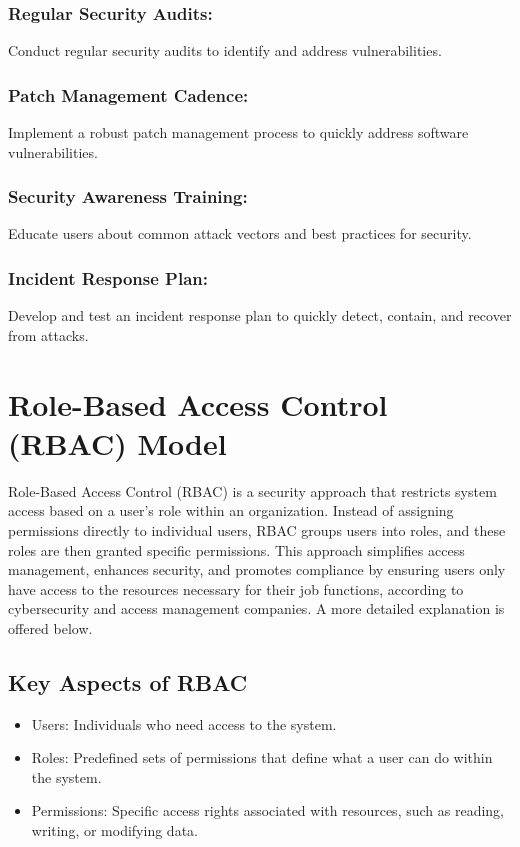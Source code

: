 \subsubsection{\textbf{Regular Security Audits:}}
Conduct regular security audits to identify and address vulnerabilities. 

\subsubsection{\textbf{Patch Management Cadence:}}
Implement a robust patch management process to quickly address software vulnerabilities. 

\subsubsection{\textbf{Security Awareness Training:}}
Educate users about common attack vectors and best practices for security. 

\subsubsection{\textbf{Incident Response Plan:}}
Develop and test an incident response plan to quickly detect, contain, and recover from attacks. 

\section{Role-Based Access Control (RBAC) Model}
Role-Based Access Control (RBAC) is a security approach that restricts system access based on a user's role within an organization. Instead of assigning permissions directly to individual users, RBAC groups users into roles, and these roles are then granted specific permissions. This approach simplifies access management, enhances security, and promotes compliance by ensuring users only have access to the resources necessary for their job functions, according to cybersecurity and access management companies. A more detailed explanation is offered below.

\subsection{Key Aspects of RBAC}
\begin{itemize}
    \item Users: Individuals who need access to the system. 
    \item Roles: Predefined sets of permissions that define what a user can do within the system. 
    \item Permissions: Specific access rights associated with resources, such as reading, writing, or modifying data. 
\end{itemize}

